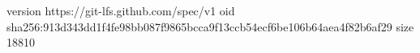version https://git-lfs.github.com/spec/v1
oid sha256:913d343dd1f4fe98bb087f9865bcca9f13ccb54ecf6be106b64aea4f82b6af29
size 18810
